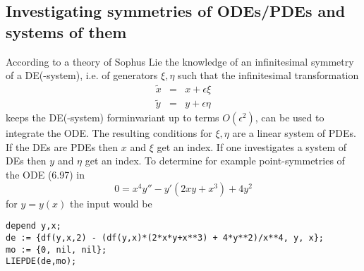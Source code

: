 \subsection{Investigating symmetries of ODEs/PDEs and systems of them}
According to a theory of Sophus Lie the knowledge of an infinitesimal symmetry
of a DE(-system), i.e. of generators $\xi, \eta$ such that the
infinitesimal transformation
\begin{eqnarray*}
\tilde{x} & = & x + \epsilon\xi   \\
\tilde{y} & = & y + \epsilon\eta
\end{eqnarray*}
keeps the DE(-system) forminvariant up to terms $O(\epsilon^2)$, can be used
to integrate the ODE. The resulting conditions for $\xi, \eta$ are a
linear system of PDEs. If the DEs are PDEs then $x$ and $\xi$ get an
index. If one investigates a system of DEs then $y$ and $\eta$ get an index.
To determine for example point-symmetries of the ODE (6.97) in \cite{Ka}
\begin{equation}
0 = x^4y'' - y'(2xy + x^3) + 4y^2  \label{k97} 
\end{equation}
for $y = y(x)$ the input would be
\begin{verbatim}
depend y,x;
de := {df(y,x,2) - (df(y,x)*(2*x*y+x**3) + 4*y**2)/x**4, y, x};
mo := {0, nil, nil};
LIEPDE(de,mo);
\end{verbatim}

